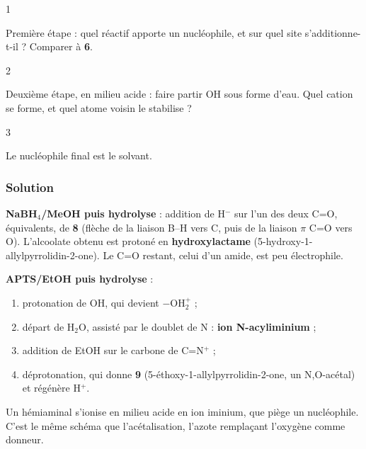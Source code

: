 \documentclass[11pt,a4paper]{article}
\providecommand{\tightlist}{\setlength{\itemsep}{0pt}\setlength{\parskip}{0pt}}
\begin{document}
\begin{indication}{1}

Première étape : quel réactif apporte un nucléophile, et sur quel site s'additionne-t-il ? Comparer à \textbf{6}.

\end{indication}

\begin{indication}{2}

Deuxième étape, en milieu acide : faire partir OH sous forme d'eau. Quel cation se forme, et quel atome voisin le stabilise ?

\end{indication}

\begin{indication}{3}

Le nucléophile final est le solvant.

\end{indication}

\hypertarget{solution-43}{%
\subsubsection{Solution}\label{solution-43}}

\textbf{NaBH\(_4\)/MeOH puis hydrolyse} : addition de H\(^-\) sur l'un des deux C=O, équivalents, de \textbf{8} (flèche de la liaison B--H vers C, puis de la liaison \(\pi\) C=O vers O). L'alcoolate obtenu est protoné en \textbf{hydroxylactame} (5-\allowbreak{}hydroxy-\allowbreak{}1-\allowbreak{}allylpyrrolidin-\allowbreak{}2-\allowbreak{}one). Le C=O restant, celui d'un amide, est peu électrophile.

\textbf{APTS/EtOH puis hydrolyse} :

\begin{enumerate}
\def\labelenumi{\arabic{enumi}.}
\tightlist
\item
  protonation de OH, qui devient \(-\mathrm{OH_2^+}\) ;
\item
  départ de H\(_2\)O, assisté par le doublet de N : \textbf{ion N-acyliminium} ;
\item
  addition de EtOH sur le carbone de C=N\(^+\) ;
\item
  déprotonation, qui donne \textbf{9} (5-\allowbreak{}éthoxy-\allowbreak{}1-\allowbreak{}allylpyrrolidin-\allowbreak{}2-\allowbreak{}one, un N,O-acétal) et régénère H\(^+\).
\end{enumerate}

\begin{methode}

Un hémiaminal s'ionise en milieu acide en ion iminium, que piège un nucléophile. C'est le même schéma que l'acétalisation, l'azote remplaçant l'oxygène comme donneur.

\end{methode}
\end{document}
